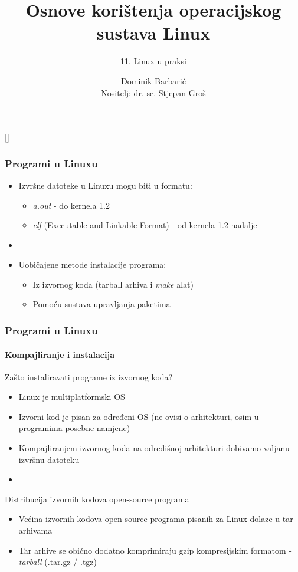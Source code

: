 \documentclass[table,usenames,dvipsnames]{beamer}
\title{Osnove korištenja operacijskog sustava Linux}
\subtitle{11. Linux u praksi}
\author[Dominik Barbarić]{Dominik Barbarić\\ \small{Nositelj: dr. sc. Stjepan Groš}}
\institute[FER]{Sveučilište u Zagrebu \\
	Fakultet elektrotehnike i računarstva}
\date{\todayiso}
\begin{document}
{
	
	\begin{frame}
		\maketitle
	\end{frame}
}

\begin{frame}[t]
	\frametitle{Programi u Linuxu}
	\begin{itemize}
		\item Izvršne datoteke u Linuxu mogu biti u formatu:
		\begin{itemize}
			\item \emph{a.out} - do kernela 1.2
			\item \emph{elf} (Executable and Linkable Format) - od kernela 1.2 nadalje
		\end{itemize}
		\item[]
		\item Uobičajene metode instalacije programa:
		\begin{itemize}
			\item Iz izvornog koda (tarball arhiva i \emph{make} alat)
			\item Pomoću sustava upravljanja paketima
		\end{itemize}
	\end{itemize}
\end{frame}

\begin{frame}[t]
	\frametitle{Programi u Linuxu}
	\framesubtitle{Kompajliranje i instalacija}
	Zašto instaliravati programe iz izvornog koda?
	\begin{itemize}
		\item Linux je multiplatformski OS
		\item Izvorni kod je pisan za određeni OS (ne ovisi o arhitekturi, osim u programima posebne namjene)
		\item Kompajliranjem izvornog koda na odredišnoj arhitekturi dobivamo valjanu izvršnu datoteku
		\item[]
	\end{itemize}
	Distribucija izvornih kodova open-source programa
	\begin{itemize}
		\item Većina izvornih kodova open source programa pisanih za Linux dolaze u tar arhivama
		\item Tar arhive se obično dodatno komprimiraju gzip kompresijskim formatom - \emph{tarball} (.tar.gz / .tgz)
	\end{itemize}
\end{frame}
\end{document}
